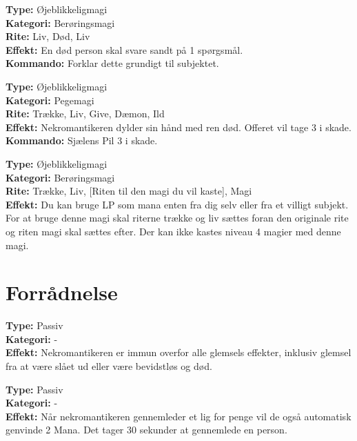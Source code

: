 \begin{nSjæl*}
\textbf{Type:} Øjeblikkeligmagi\\
\textbf{Kategori:} Berøringsmagi\\
\textbf{Rite:} Liv, Død, Liv\\
\textbf{Effekt:} En død person skal svare sandt på 1 spørgsmål.\\
\textbf{Kommando:} Forklar dette grundigt til subjektet.
\end{nSjæl*}

\begin{nSjæl*}
\textbf{Type:} Øjeblikkeligmagi\\
\textbf{Kategori:} Pegemagi\\
\textbf{Rite:} Trække, Liv, Give, Dæmon, Ild\\
\textbf{Effekt:} Nekromantikeren dylder sin hånd med ren død. Offeret vil tage 3 i skade.\\
\textbf{Kommando:} Sjælens Pil 3 i skade.\\

\end{nSjæl*}

\begin{nSjæl*}
\textbf{Type:} Øjeblikkeligmagi\\
\textbf{Kategori:} Berøringsmagi\\
\textbf{Rite:} Trække, Liv, [Riten til den magi du vil kaste], Magi\\
\textbf{Effekt:} Du kan bruge LP som mana enten fra dig selv eller fra et villigt subjekt. For at bruge denne magi skal riterne trække og liv sættes foran den originale rite og riten magi skal sættes efter. Der kan ikke kastes niveau 4 magier med denne magi.
\end{nSjæl*}

\section*{Forrådnelse}

\begin{død*}
\textbf{Type:} Passiv\\
\textbf{Kategori:} -\\
\textbf{Effekt:} Nekromantikeren er immun overfor alle glemsels effekter, inklusiv glemsel fra at være slået ud eller være bevidstløs og død.
\end{død*}

\begin{død*}
\textbf{Type:} Passiv \\
\textbf{Kategori:} -\\
\textbf{Effekt:} Når nekromantikeren gennemleder et lig for penge vil de også automatisk genvinde 2 Mana. Det tager 30 sekunder at gennemlede en person.\\ 
\end{død*}

